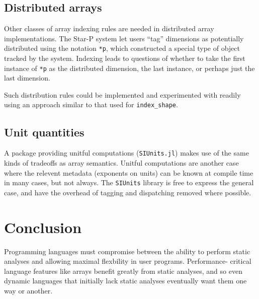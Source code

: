 \documentclass[preprint]{sigplanconf}
\newcommand{\code}[1]{\texttt{#1}}
\begin{document}
\subsection{Distributed arrays}

Other classes of array indexing rules are needed in distributed array
implementations. The Star-P system \cite{parry, Choy05parallelmatlab}
let users ``tag'' dimensions as potentially distributed using the notation
\code{*p}, which constructed a special type of object tracked by the system.
Indexing leads to questions of whether to take the first instance of \code{*p}
as the distributed dimension, the last instance, or perhaps just the last dimension.

Such distribution rules could be implemented and experimented with readily
using an approach similar to that used for \code{index\_shape}.



\subsection{Unit quantities}

A package providing unitful computations (\code{SIUnits.jl}\cite{Fischer:2014si})
makes use of the same kinds of
tradeoffs as array semantics. Unitful computations are another case
where the relevent metadata (exponents on units) can be
known at compile time in many cases, but not always. The
\code{SIUnits} library is free to express the general case, and have the
overhead of tagging and dispatching removed where possible.



\section{Conclusion}

Programming languages must compromise between the ability to perform
static analyses and allowing maximal flexbility in user programs. Performance-
critical language features like arrays benefit greatly from static analyses,
and so even dynamic languages that initially lack static analyses eventually
want them one way or another.
\end{document}
